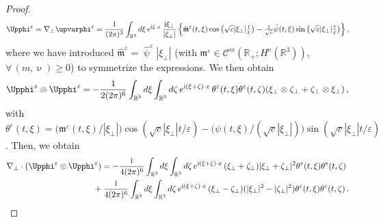 \documentclass[11pt,reqno]{amsart}
\def \R{{\mathbb{R}}}
\begin{document}
\begin{proof}
  \begin{equation*}
    \label{Upphieps-R}
    \Upphi^\varepsilon= \nabla_\perp \upvarphi^\varepsilon = \frac{1}{(2\pi)^3}
    \int_{\R^3}d\xi\, e^{{\rm i}\xi\cdot x} \, \frac{{\rm i}\xi_\perp}{|\xi_\perp|} \, \Big \{
   \hat{\mathfrak m}^\varepsilon(t,\xi)\cos\big(\sqrt{c}|\xi_\perp|\tfrac t \varepsilon\big) -
    \tfrac{1}{\sqrt{c}} \hat\psi(t,\xi)\sin\big(\sqrt{c}|\xi_\perp|\tfrac t \varepsilon\big)
    \Big \}\,,
  \end{equation*}  
  where we have introduced $ \hat{\mathfrak m}^\varepsilon=\hat\uppsi^\varepsilon |\xi_\perp| $ (with
  ${\mathfrak m}^\varepsilon \in \mathscr{C}^m(\R_+; H^\upnu(\R^3))$, $\forall \,(m,\upnu)\geq 0$) to symmetrize the expressions.
  We then obtain
  \begin{equation}
    \label{eqn:upup-R}
    \Upphi^\varepsilon\otimes \Upphi^\varepsilon
    = -\frac{1}{2(2\pi)^6} \int_{\R^3}d\xi \int_{\R^3}d\zeta\, e^{{\rm i}(\xi+\zeta)\cdot x} \, \theta^\varepsilon(t,\xi)  \theta^\varepsilon(t,\zeta)
    ( \xi_\perp \otimes \zeta_\perp +\zeta_\perp \otimes \xi_\perp)\,, 
  \end{equation}
  with
  $
  \theta^\varepsilon(t,\xi)= \big(\mathfrak m^\varepsilon(t,\xi)/|\xi_\perp|\big) \cos(\sqrt{c}|\xi_\perp| t /\varepsilon) - \big({\psi(t,\xi)}/({\sqrt{c}|\xi_\perp|})\big)
  \sin (\sqrt{c}|\xi_\perp| t /\varepsilon)
  $. Then, we obtain 
  \begin{align}
    \label{eqn:divuu-R}
    \nabla_\perp \cdot (\Upphi^\varepsilon\otimes \Upphi^\varepsilon)
    &= -\frac{{\rm i}}{4(2\pi)^6} \int_{\R^3}d\xi \int_{\R^3}d\zeta\, e^{{\rm i}(\xi+\zeta)\cdot x} \, (\xi_\perp + \zeta_\perp)|\xi_\perp + \zeta_\perp|^2
    \theta^\varepsilon(t,\xi)  \theta^\varepsilon(t,\zeta) \nonumber \\
    & \hspace{-10pt}+\frac{{\rm i}}{4(2\pi)^6} \int_{\R^3}d\xi \int_{\R^3}d\zeta\, e^{{\rm i}(\xi+\zeta)\cdot x} \, (\xi_\perp - \zeta_\perp)(|\xi_\perp|^2 - |\zeta_\perp|^2)
    \theta^\varepsilon(t,\xi)  \theta^\varepsilon(t,\zeta)\,. 
  \end{align}

\end{proof}
\end{document}
